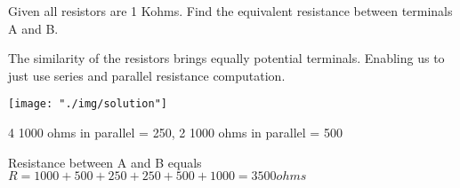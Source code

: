 	
		\question Given all resistors are 1 Kohms. Find the equivalent resistance between terminals A and B.
		
		
		\begin{solution}
			The similarity of the resistors brings equally potential terminals. Enabling us to just use series and parallel resistance computation.
			\begin{center}
			\texttt{[image: "./img/solution"]} %
			\end{center}
			4 1000 ohms in parallel = 250,
			2 1000 ohms in parallel = 500
			
			Resistance between A and B equals
			$R = 1000 + 500 + 250 + 250 + 500 + 1000 = 3500 ohms$
		\end{solution}
	
		\finalAns{$3500 \Omega$}
		